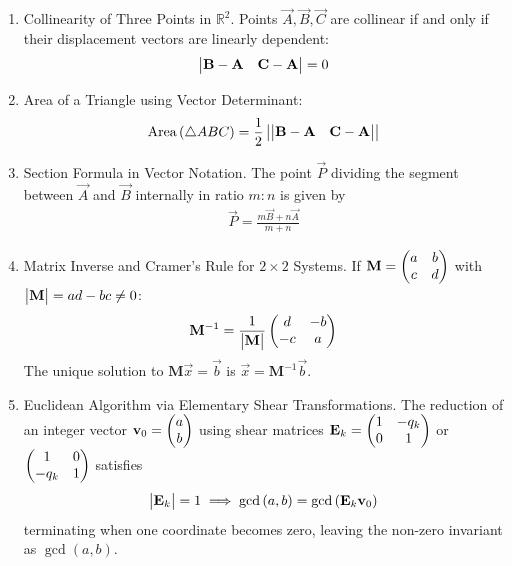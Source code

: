 \documentclass[12pt,a4paper]{article}
\begin{document}
\begin{enumerate}[label=\thesubsection.\arabic*, ref=\thesubsection.\theenumi]
	\item Collinearity of Three Points in $\mathbb{R}^2$.
	Points $\vec{A}, \vec{B}, \vec{C}$ are collinear if and only if their displacement vectors are linearly dependent:
	\begin{align}
		\begin{vmatrix}\mathbf{B} - \mathbf{A} & \mathbf{C} - \mathbf{A}\end{vmatrix} = 0 \label{eq:CBSE10-2019-collinear}
	\end{align}
	
	\item Area of a Triangle using Vector Determinant:
	\begin{align}
		\text{Area}\left(\triangle ABC\right) = \frac{1}{2} \left\vert\begin{vmatrix}\mathbf{B} - \mathbf{A} & \mathbf{C} - \mathbf{A}\end{vmatrix}\right\vert \label{eq:CBSE10-2019-triangle_area_det}
	\end{align}
	
	\item Section Formula in Vector Notation.
	The point $\vec{P}$ dividing the segment between $\vec{A}$ and $\vec{B}$ internally in ratio $m:n$ is given by
	\begin{align}
		\vec{P} = \frac{m\vec{B} + n\vec{A}}{m + n} \label{eq:CBSE10-2019-section_formula}
	\end{align}
	
	\item Matrix Inverse and Cramer's Rule for $2 \times 2$ Systems.
	If $\mathbf{M} = \begin{pmatrix}a & b \\ c & d\end{pmatrix}$ with $\begin{vmatrix}\mathbf{M}\end{vmatrix} = ad - bc \neq 0$:
	\begin{align}
		\mathbf{M}^{-1} = \frac{1}{\begin{vmatrix}\mathbf{M}\end{vmatrix}} \begin{pmatrix}d & -b \\ -c & a\end{pmatrix} \label{eq:CBSE10-2019-matrix_inverse}
	\end{align}
	The unique solution to $\mathbf{M}\vec{x} = \vec{b}$ is $\vec{x} = \mathbf{M}^{-1}\vec{b}$.
	
	\item Euclidean Algorithm via Elementary Shear Transformations.
	The reduction of an integer vector $\mathbf{v}_0 = \begin{pmatrix}a \\ b\end{pmatrix}$ using shear matrices $\mathbf{E}_k = \begin{pmatrix}1 & -q_k \\ 0 & 1\end{pmatrix}$ or $\begin{pmatrix}1 & 0 \\ -q_k & 1\end{pmatrix}$ satisfies
	\begin{align}
		\begin{vmatrix}\mathbf{E}_k\end{vmatrix} = 1 \implies \gcd\left(a, b\right) = \gcd\left(\mathbf{E}_k \mathbf{v}_0\right) \label{eq:CBSE10-2019-euclid_shear}
	\end{align}
	terminating when one coordinate becomes zero, leaving the non-zero invariant as $\gcd(a, b)$.
	

\end{enumerate}
\end{document}
